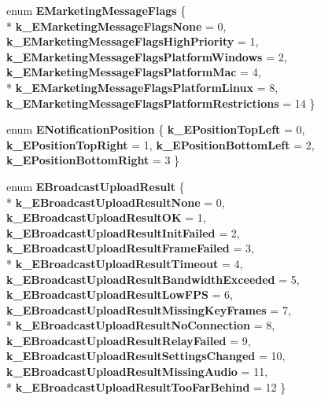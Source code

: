 \begin{DoxyCompactItemize}
\item 
\hypertarget{namespaceValve_1_1Steamworks_a5b1c56d4409b20a9175d4923283f4940}{}enum {\bfseries E\+Marketing\+Message\+Flags} \{ \\*
{\bfseries k\+\_\+\+E\+Marketing\+Message\+Flags\+None} = 0, 
{\bfseries k\+\_\+\+E\+Marketing\+Message\+Flags\+High\+Priority} = 1, 
{\bfseries k\+\_\+\+E\+Marketing\+Message\+Flags\+Platform\+Windows} = 2, 
{\bfseries k\+\_\+\+E\+Marketing\+Message\+Flags\+Platform\+Mac} = 4, 
\\*
{\bfseries k\+\_\+\+E\+Marketing\+Message\+Flags\+Platform\+Linux} = 8, 
{\bfseries k\+\_\+\+E\+Marketing\+Message\+Flags\+Platform\+Restrictions} = 14
 \}\label{namespaceValve_1_1Steamworks_a5b1c56d4409b20a9175d4923283f4940}

\item 
\hypertarget{namespaceValve_1_1Steamworks_a58cd292bad1160d42a70198c4d8251f3}{}enum {\bfseries E\+Notification\+Position} \{ {\bfseries k\+\_\+\+E\+Position\+Top\+Left} = 0, 
{\bfseries k\+\_\+\+E\+Position\+Top\+Right} = 1, 
{\bfseries k\+\_\+\+E\+Position\+Bottom\+Left} = 2, 
{\bfseries k\+\_\+\+E\+Position\+Bottom\+Right} = 3
 \}\label{namespaceValve_1_1Steamworks_a58cd292bad1160d42a70198c4d8251f3}

\item 
\hypertarget{namespaceValve_1_1Steamworks_a3da1de8e0d18df37e18ef635d7a78c1a}{}enum {\bfseries E\+Broadcast\+Upload\+Result} \{ \\*
{\bfseries k\+\_\+\+E\+Broadcast\+Upload\+Result\+None} = 0, 
{\bfseries k\+\_\+\+E\+Broadcast\+Upload\+Result\+O\+K} = 1, 
{\bfseries k\+\_\+\+E\+Broadcast\+Upload\+Result\+Init\+Failed} = 2, 
{\bfseries k\+\_\+\+E\+Broadcast\+Upload\+Result\+Frame\+Failed} = 3, 
\\*
{\bfseries k\+\_\+\+E\+Broadcast\+Upload\+Result\+Timeout} = 4, 
{\bfseries k\+\_\+\+E\+Broadcast\+Upload\+Result\+Bandwidth\+Exceeded} = 5, 
{\bfseries k\+\_\+\+E\+Broadcast\+Upload\+Result\+Low\+F\+P\+S} = 6, 
{\bfseries k\+\_\+\+E\+Broadcast\+Upload\+Result\+Missing\+Key\+Frames} = 7, 
\\*
{\bfseries k\+\_\+\+E\+Broadcast\+Upload\+Result\+No\+Connection} = 8, 
{\bfseries k\+\_\+\+E\+Broadcast\+Upload\+Result\+Relay\+Failed} = 9, 
{\bfseries k\+\_\+\+E\+Broadcast\+Upload\+Result\+Settings\+Changed} = 10, 
{\bfseries k\+\_\+\+E\+Broadcast\+Upload\+Result\+Missing\+Audio} = 11, 
\\*
{\bfseries k\+\_\+\+E\+Broadcast\+Upload\+Result\+Too\+Far\+Behind} = 12
 \}\label{namespaceValve_1_1Steamworks_a3da1de8e0d18df37e18ef635d7a78c1a}


\end{DoxyCompactItemize}
